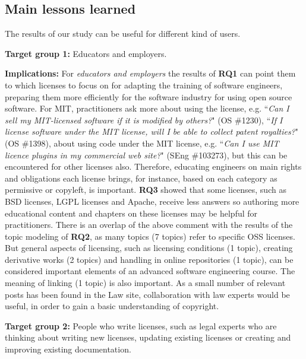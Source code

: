 \documentclass{elsarticle}
\begin{document}
\subsection{Main lessons learned}

The results of our study can be useful for different kind of users. 

\textbf{Target group 1:} Educators and employers.

\textbf{Implications:} For \emph{educators and employers} the results of \textbf{RQ1} can point them to which licenses to focus on for adapting the training of software engineers, preparing them more efficiently for the software industry for using open source software. For MIT, practitioners ask more about using the license, e.g. ``\emph{Can I sell my MIT-licensed software if it is modified by others?}" (OS \#1230), ``\emph{If I license software under the MIT license, will I be able to collect patent royalties?}" (OS \#1398), about using code under the MIT license, e.g. ``\emph{Can I use MIT licence plugins in my commercial web site?}" (SEng \#103273), but this can be encountered for other licenses also. Therefore, educating engineers on main rights and obligations each license brings, for instance, based on each category as permissive or copyleft, is important. \textbf{RQ3} showed that some licenses, such as BSD licenses, LGPL licenses and Apache, receive less answers so authoring more educational content and chapters on these licenses may be helpful for practitioners. There is an overlap of the above comment with the results of the topic modeling of \textbf{RQ2}, as many topics (7 topics) refer to specific OSS licenses. But general aspects of licensing, such as licensing conditions (1 topic), creating derivative works (2 topics) and handling in online repositories (1 topic), can be considered important elements of an advanced software engineering course. The meaning of linking (1 topic) is also important. As a small number of relevant posts has been found in the Law site, collaboration with law experts would be useful, in order to gain a basic understanding of copyright. 

\textbf{Target group 2:} People who write licenses, such as legal experts who are thinking about writing new licenses, updating existing licenses or creating and improving existing documentation.
\end{document}
